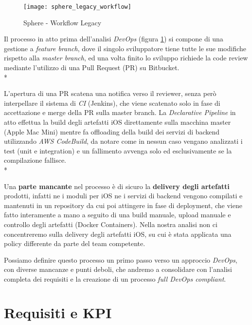 \documentclass[../main.tex]{subfiles}
\begin{document}
    	    \begin{figure}[H]
    			\centering
    			\texttt{[image: sphere\_legacy\_workflow]}
    			\caption{Sphere - Workflow Legacy}
    			\label{fig:sphere_legacy_workflow}
    	    \end{figure}
    	    
    	    Il processo in atto prima dell'analisi \emph{DevOps} (figura \ref{fig:sphere_legacy_workflow}) si compone di una gestione a \emph{feature branch}, dove il singolo sviluppatore tiene tutte le sue modifiche rispetto alla \emph{master branch}, ed una volta finito lo sviluppo richiede la code review mediante l'utilizzo di una Pull Request (PR) su Bitbucket.\\*
    	    
    	    L'apertura di una PR scatena una notifica verso il reviewer, senza però interpellare il sistema di \emph{CI} (Jenkins), che viene scatenato solo in fase di accettazione e merge della PR sulla master branch. La \emph{Declarative Pipeline} in atto effettua la build degli artefatti iOS direttamente sulla macchina master (Apple Mac Mini) mentre fa offloading della build dei servizi di backend utilizzando \emph{AWS CodeBuild}, da notare come in nessun caso vengano analizzati i test (unit e integration) e un fallimento avvenga solo ed esclusivamente se la compilazione fallisce.\\*
    	    
    	    Una \textbf{parte mancante} nel processo è di sicuro la \textbf{delivery degli artefatti} prodotti, infatti ne i moduli per iOS ne i servizi di backend vengono compilati e mantenuti in un repository da cui poi attingere in fase di deployment, che viene fatto interamente a mano a seguito di una build manuale, upload manuale e controllo degli artefatti (Docker Containers). Nella nostra analisi non ci concentreremo sulla delivery degli artefatti iOS, su cui è stata applicata una policy differente da parte del team competente.
    	    
    	    Possiamo definire questo processo un primo passo verso un approccio \emph{DevOps}, con diverse mancanze e punti deboli, che andremo a consolidare con l'analisi completa dei requisiti e la creazione di un processo \emph{full DevOps compliant}.
    	
    	\section{Requisiti e KPI}
    	\label{sec:requirements_kpi}
    	
\end{document}
